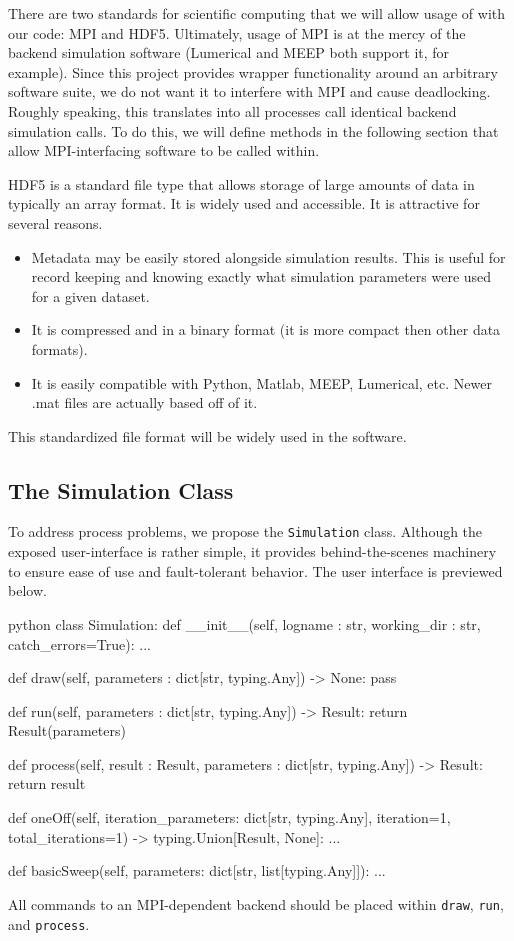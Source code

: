\documentclass[12pt]{article}
\begin{document}
There are two standards for scientific computing that we will allow usage of with our code: MPI and HDF5. Ultimately, usage of MPI is at the mercy of the backend simulation software (Lumerical and MEEP \cite{meep} both support it, for example). Since this project provides wrapper functionality around an arbitrary software suite, we do not want it to interfere with MPI and cause deadlocking. Roughly speaking, this translates into all processes call identical backend simulation calls. To do this, we will define methods in the following section that allow MPI-interfacing software to be called within. 

HDF5 is a standard file type that allows storage of large amounts of data in typically an array format. It is widely used and accessible. It is attractive for several reasons.
\begin{itemize}
\item Metadata may be easily stored alongside simulation results. This is useful for record keeping and knowing exactly what simulation parameters were used for a given dataset. 
\item It is compressed and in a binary format (it is more compact then other data formats).
\item It is easily compatible with Python, Matlab, MEEP, Lumerical, etc. Newer .mat files are actually based off of it.
\end{itemize}
This standardized file format will be widely used in the software.

\subsection{The Simulation Class}
To address process problems, we propose the \texttt{Simulation} class. Although the exposed user-interface is rather simple, it provides behind-the-scenes machinery to ensure ease of use and fault-tolerant behavior. The user interface is previewed below. 
\begin{mintedbox}{python}
class Simulation:
	def __init__(self, logname : str, working_dir : str, catch_errors=True):     
	    ...

    def draw(self, parameters : dict[str, typing.Any]) -> None:
        pass
    
    def run(self, parameters : dict[str, typing.Any]) -> Result:
        return Result(parameters)
    
    def process(self, result : Result, parameters : dict[str, typing.Any]) -> Result:
        return result
        
    def oneOff(self, iteration_parameters: dict[str, typing.Any], iteration=1, total_iterations=1) -> typing.Union[Result, None]:
    	...
        
    def basicSweep(self, parameters: dict[str, list[typing.Any]]):
    	...
\end{mintedbox}
All commands to an MPI-dependent backend should be placed within \texttt{draw}, \texttt{run}, and \texttt{process}.  
\end{document}
